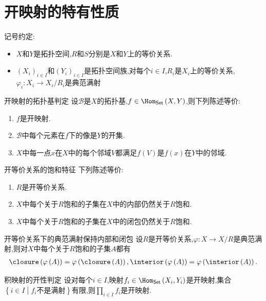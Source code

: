 \section{开映射的特有性质}

记号约定:
\begin{itemize}
	\item $X$和$Y$是拓扑空间,$R$和$S$分别是$X$和$Y$上的等价关系.
	\item $\left(X_{i}\right)_{i\in I}$和$\left(Y_{i}\right)_{i\in I}$是拓扑空间族,对每个$i\in I$,$R_{i}$是$X_{i}$上的等价关系,$\varphi_{i}:X_{i}\to X_{i}/R_{i}$是典范满射
\end{itemize}

\begin{proposition}{开映射的拓扑基判定}{}
	设$\mathcal{B}$是$X$的拓扑基,$f\in\Hom_{\mathsf{Set}}\left(X,Y\right)$,则下列陈述等价:
	\begin{enumerate}
		\item $f$是开映射.
		\item $\mathcal{B}$中每个元素在$f$下的像是$Y$的开集.
		\item $X$中每一点$x$在$X$中的每个邻域$V$都满足$f\left(V\right)$是$f\left(x\right)$在$Y$中的邻域.
	\end{enumerate}
\end{proposition}

\begin{proposition}{开等价关系的饱和特征}{}
	下列陈述等价:
	\begin{enumerate}
		\item $R$是开等价关系.
		\item $X$中每个关于$R$饱和的子集在$X$中的内部仍然关于$R$饱和.
		\item $X$中每个关于$R$饱和的子集在$X$中的闭包仍然关于$R$饱和.
	\end{enumerate}
\end{proposition}

\begin{proposition}{开等价关系下的典范满射保持内部和闭包}{}
	设$R$是开等价关系,$\varphi:X\to X/R$是典范满射,则对$X$中每个关于$R$饱和的子集$A$都有
	\begin{align*}
		\closure\left(\varphi\left(A\right)\right)=\varphi\left(\closure\left(A\right)\right),\interior\left(\varphi\left(A\right)\right)=\varphi\left(\interior\left(A\right)\right).
	\end{align*}
\end{proposition}

\begin{proposition}{积映射的开性判定}{}
	设对每个$i\in I$,映射$f_{i}\in\Hom_{\mathsf{Set}}\left(X_{i},Y_{i}\right)$是开映射,集合$\left\{i\in I\middle|f_{i}\text{不是满射}\right\}$有限,则$\prod\limits_{i\in I}f_{i}$是开映射.
\end{proposition}

